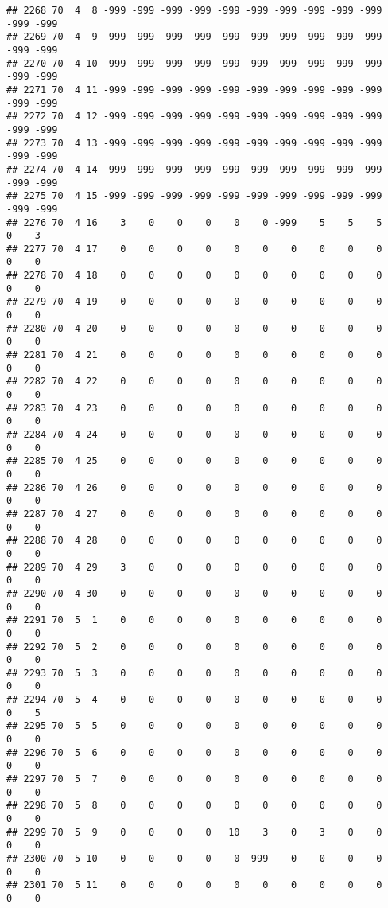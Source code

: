 \documentclass[]{article}
\begin{document}
\begin{verbatim}
## 2268 70  4  8 -999 -999 -999 -999 -999 -999 -999 -999 -999 -999 -999 -999
## 2269 70  4  9 -999 -999 -999 -999 -999 -999 -999 -999 -999 -999 -999 -999
## 2270 70  4 10 -999 -999 -999 -999 -999 -999 -999 -999 -999 -999 -999 -999
## 2271 70  4 11 -999 -999 -999 -999 -999 -999 -999 -999 -999 -999 -999 -999
## 2272 70  4 12 -999 -999 -999 -999 -999 -999 -999 -999 -999 -999 -999 -999
## 2273 70  4 13 -999 -999 -999 -999 -999 -999 -999 -999 -999 -999 -999 -999
## 2274 70  4 14 -999 -999 -999 -999 -999 -999 -999 -999 -999 -999 -999 -999
## 2275 70  4 15 -999 -999 -999 -999 -999 -999 -999 -999 -999 -999 -999 -999
## 2276 70  4 16    3    0    0    0    0    0 -999    5    5    5    0    3
## 2277 70  4 17    0    0    0    0    0    0    0    0    0    0    0    0
## 2278 70  4 18    0    0    0    0    0    0    0    0    0    0    0    0
## 2279 70  4 19    0    0    0    0    0    0    0    0    0    0    0    0
## 2280 70  4 20    0    0    0    0    0    0    0    0    0    0    0    0
## 2281 70  4 21    0    0    0    0    0    0    0    0    0    0    0    0
## 2282 70  4 22    0    0    0    0    0    0    0    0    0    0    0    0
## 2283 70  4 23    0    0    0    0    0    0    0    0    0    0    0    0
## 2284 70  4 24    0    0    0    0    0    0    0    0    0    0    0    0
## 2285 70  4 25    0    0    0    0    0    0    0    0    0    0    0    0
## 2286 70  4 26    0    0    0    0    0    0    0    0    0    0    0    0
## 2287 70  4 27    0    0    0    0    0    0    0    0    0    0    0    0
## 2288 70  4 28    0    0    0    0    0    0    0    0    0    0    0    0
## 2289 70  4 29    3    0    0    0    0    0    0    0    0    0    0    0
## 2290 70  4 30    0    0    0    0    0    0    0    0    0    0    0    0
## 2291 70  5  1    0    0    0    0    0    0    0    0    0    0    0    0
## 2292 70  5  2    0    0    0    0    0    0    0    0    0    0    0    0
## 2293 70  5  3    0    0    0    0    0    0    0    0    0    0    0    0
## 2294 70  5  4    0    0    0    0    0    0    0    0    0    0    0    5
## 2295 70  5  5    0    0    0    0    0    0    0    0    0    0    0    0
## 2296 70  5  6    0    0    0    0    0    0    0    0    0    0    0    0
## 2297 70  5  7    0    0    0    0    0    0    0    0    0    0    0    0
## 2298 70  5  8    0    0    0    0    0    0    0    0    0    0    0    0
## 2299 70  5  9    0    0    0    0   10    3    0    3    0    0    0    0
## 2300 70  5 10    0    0    0    0    0 -999    0    0    0    0    0    0
## 2301 70  5 11    0    0    0    0    0    0    0    0    0    0    0    0

\end{verbatim}
\end{document}
